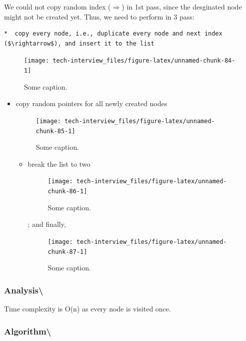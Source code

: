 \documentclass[]{book}
\providecommand{\tightlist}{%
  \setlength{\itemsep}{0pt}\setlength{\parskip}{0pt}}
\begin{document}
We could not copy random index (\(\Rightarrow\)) in 1st pass, since the desginated node might not be created yet. Thus, we need to
perform in 3 pass:

\begin{verbatim}
*  copy every node, i.e., duplicate every node and next index ($\rightarrow$), and insert it to the list
\end{verbatim}

\begin{figure}
\texttt{[image: tech-interview\_files/figure-latex/unnamed-chunk-84-1]} \caption{Some caption.}\label{fig:unnamed-chunk-84}
\end{figure}

\begin{itemize}
\tightlist
\item
  copy random pointers for all newly created nodes

  \begin{figure}
  \texttt{[image: tech-interview\_files/figure-latex/unnamed-chunk-85-1]} \caption{Some caption.}\label{fig:unnamed-chunk-85}
  \end{figure}

  \begin{itemize}
  \tightlist
  \item
    break the list to two

    \begin{figure}
    \texttt{[image: tech-interview\_files/figure-latex/unnamed-chunk-86-1]} \caption{Some caption.}\label{fig:unnamed-chunk-86}
    \end{figure}

    ; and finally,

    \begin{figure}
    \texttt{[image: tech-interview\_files/figure-latex/unnamed-chunk-87-1]} \caption{Some caption.}\label{fig:unnamed-chunk-87}
    \end{figure}
  \end{itemize}
\end{itemize}

\hypertarget{analysis-126}{%
\subsubsection{Analysis\textbackslash{}}\label{analysis-126}}

Time complexity is O(n) as every node is visited once.

\hypertarget{algorithm-131}{%
\subsubsection{Algorithm\textbackslash{}}\label{algorithm-131}}
\end{document}
